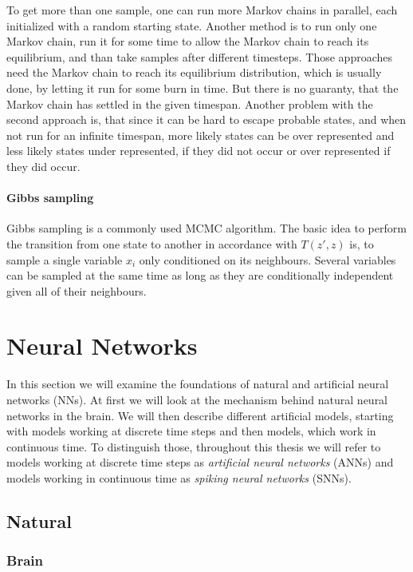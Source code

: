 To get more than one sample, one can run more Markov chains in parallel, each initialized with a random starting state. 
Another method is to run only one Markov chain, run it for some time to allow the Markov chain to reach its equilibrium, and than take samples after different timesteps.
Those approaches need the Markov chain to reach its equilibrium distribution, which is usually done, by letting it run for some burn in time.
But there is no guaranty, that the Markov chain has settled in the given timespan.    
Another problem with the second approach is, that since it can be hard to escape probable states, and when not run for an infinite timespan, more likely states can be over represented and less likely states under represented, if they did not occur or over represented if they did occur.  

\paragraph{Gibbs sampling} Gibbs sampling is a commonly used MCMC algorithm. The basic idea to perform the transition from one state to another in accordance with $T(z',z)$ is, to sample a single variable $x_i$ only conditioned on its neighbours. 
Several variables can be sampled at the same time as long as they are conditionally independent given all of their neighbours.

\section{Neural Networks}

In this section we will examine the foundations of natural and artificial neural networks (NNs).
At first we will look at the mechanism behind natural neural networks in the brain.
We will then describe different artificial models, starting with models working at discrete time steps and then models, which work in continuous time.
To distinguish those, throughout this thesis we will refer to models working at discrete time steps as \textit{artificial neural networks} (ANNs) and models working in continuous time as \textit{spiking neural networks} (SNNs).

\subsection{Natural}
\subsubsection{Brain}

